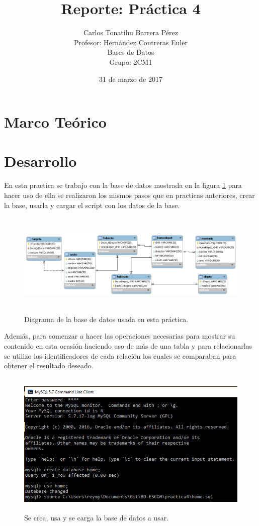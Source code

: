 \documentclass[12pt, titlepage]{article}
\title{Reporte: Práctica 4}
\author{Carlos Tonatihu Barrera Pérez \\ Profesor: Hernández Contreras Euler \\ Bases de Datos \\ Grupo: 2CM1 }
\date{31 de marzo de 2017}
\begin{document}
\maketitle
\tableofcontents
\section{Marco Teórico}
\section{Desarrollo}
En esta practica se trabajo con la base de datos mostrada en la figura \ref{fig:home} para hacer uso de ella se realizaron los mismos pasos que en practicas anteriores, crear la base, usarla y cargar el script con los datos de la base.
 \begin{figure}[H]
	\begin{center}
		\includegraphics[width=15cm, height=5cm]{img/home.png}
		\caption{Diagrama de la base de datos usada en esta práctica.}
		\label{fig:home}
	\end{center}
\end{figure}
Además, para comenzar a hacer las operaciones necesarias para mostrar su contenido en esta ocasión haciendo uso de más de una tabla y para relacionarlas se utilizo los identificadores de cada relación los cuales se comparaban para obtener el resultado deseado.
 \begin{figure}[H]
	\begin{center}
		\includegraphics[width=15cm, height=7cm]{img/crear.png}
		\caption{Se crea, usa y se carga la base de datos a usar.}
		\label{fig:home1}
	\end{center}
\end{figure}
\end{document}

